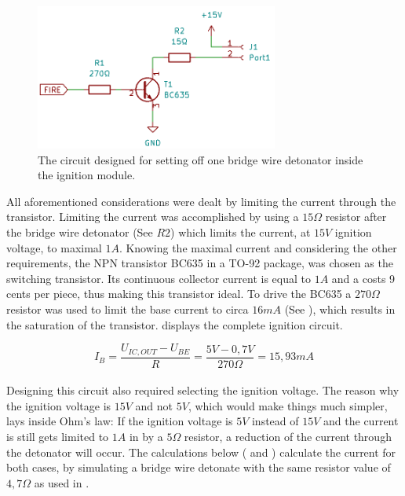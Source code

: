 \begin{figure}[!ht]
    \centering
    \includegraphics[width=8cm]{./Figures/module_ignitor.png}
    \caption{The circuit designed for setting off one bridge wire detonator inside the ignition module.}
    \label{fig:module_ignitor}     
\end{figure}

\noindent All aforementioned considerations were dealt by limiting the current through the transistor. Limiting the current was  accomplished by using a $15\Omega$ resistor after the bridge wire detonator (See  $R2$) which limits the current, at $15V$ ignition voltage, to maximal $1A$. Knowing the maximal current and considering the other requirements, the NPN transistor BC635 in a TO-92 package, was chosen as the switching transistor. Its continuous collector current is equal to $1A$ and a costs 9 cents per piece, thus making this transistor ideal. To drive the BC635 a $270\Omega$ resistor was used to limit the base current to circa $16mA$ (See ), which results in the saturation of the transistor.  displays the complete ignition circuit.

\begin{equation}
I_B=\frac{U_{IC,OUT}-U_{BE}}{R}=\frac{5V-0,7V}{270\Omega}=15,93mA
\label{eq:base_current}
\end{equation}\\

\noindent Designing this circuit also required selecting the ignition voltage. The reason why the ignition voltage is $15V$ and not $5V$, which would make things much simpler, lays inside Ohm's law: If the ignition voltage is $5V$ instead of $15V$ and the current is still gets limited to $1A$ in by a $5\Omega$ resistor, a reduction of the current through the detonator will occur. The calculations below ( and ) calculate the current for both cases, by simulating a bridge wire detonate with the same resistor value of $4,7\Omega$ as used in .

